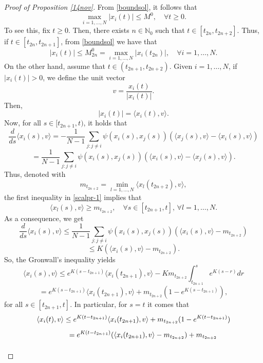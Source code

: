 \documentclass[a4paper,11pt,oneside]{article}
\begin{document}
\begin{proof}[Proof of Proposition \ref{14nov}] 
	From \eqref{boundsol}, it follows that
	\begin{equation}\label{unifboundsol}
		\max_{i=1,\dots,N}\lvert x_{i}(t)\rvert\leq M^{0},\quad \forall t\geq 0.
	\end{equation}
To see this, fix $t\geq 0$. Then, there exists $n\in \mathbb{N}_{0}$ such that $t\in [t_{2n},t_{2n+2}]$. Thus, if $t\in [t_{2n},t_{2n+1}]$, from \eqref{boundsol} we have that
\begin{equation}\label{boundsol1}
	\lvert x_{i}(t)\lvert\leq M^{0}_{2n}=\max_{i=1,\dots,N}\lvert x_{i}(t_{2n})\lvert, \quad\forall i=1,\dots,N.
\end{equation}
On the other hand, assume that $t\in (t_{2n+1},t_{2n+2})$. Given $i=1,\dots,N$, if $\lvert x_{i}(t)\lvert>0$, we define the unit vector $$v=\frac{x_{i}(t)}{\lvert x_{i}(t)\lvert}.$$
Then, $$\lvert x_{i}(t)\lvert=\langle  x_{i}(t),v\rangle.$$
Now, for all $s\in [t_{2n+1},t)$, it holds that
$$\frac{d}{ds}\langle  x_{i}(s),v\rangle=-\frac{1}{N-1}\sum_{j:j\neq i}\psi(x_{i}(s),x_{j}(s))(\langle  x_{j}(s),v\rangle-\langle  x_{i}(s),v\rangle)$$
$$=\frac{1}{N-1}\sum_{j:j\neq i}\psi(x_{i}(s),x_{j}(s))(\langle  x_{i}(s),v\rangle-\langle  x_{j}(s),v\rangle).$$
Thus, denoted with $$m_{t_{2n+2}}=\min_{l=1,\dots,N}\langle x_{l}(t_{2n+2}),v\rangle,$$
the first inequality in \eqref{scalpr-1} implies that
$$\langle x_{l}(s),v\rangle\geq m_{t_{2n+2}}, \quad \forall s\in [t_{2n+1},t],\, \forall l=1,\dots,N.$$
As a consequence, we get
$$\frac{d}{ds}\langle  x_{i}(s),v\rangle\leq \frac{1}{N-1}\sum_{j:j\neq i}\psi(x_{i}(s),x_{j}(s))(\langle  x_{i}(s),v\rangle-m_{t_{2n+2}})$$
$$\leq K(\langle  x_{i}(s),v\rangle-m_{t_{2n+2}}).$$
So, the Gronwall's inequality yields
$$\langle  x_{i}(s),v\rangle\leq e^{K(s-t_{2n+1})}\langle  x_{i}(t_{2n+1}),v\rangle-Km_{t_{2n+2}}\int_{t_{2n+1}}^{s}e^{K(s-r)}dr$$
$$=e^{K(s-t_{2n+1})}\langle  x_{i}(t_{2n+1}),v\rangle+m_{t_{2n+2}}(1-e^{K(s-t_{2n+1})}),$$
for all $s\in [t_{2n+1},t]$. In particular, for $s=t$ it comes that
$$\begin{array}{l}
	\vspace{0.3cm}\displaystyle{\langle  x_{i}(t),v\rangle\leq e^{K(t-t_{2n+1})}\langle  x_{i}(t_{2n+1}),v\rangle+m_{t_{2n+2}}(1-e^{K(t-t_{2n+1})})}\\
	\vspace{0.3cm}\displaystyle{\hspace{1.6cm}=e^{K(t-t_{2n+1})}(\langle  x_{i}(t_{2n+1}),v\rangle-m_{t_{2n+2}})+m_{t_{2n+2}}}\\

\end{array}$$
\end{proof}
\end{document}
